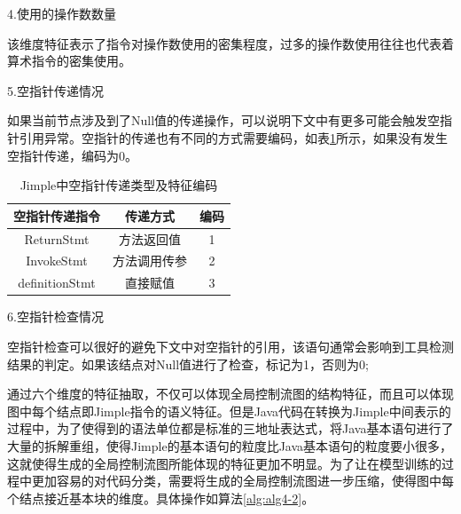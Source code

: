 4.使用的操作数数量

该维度特征表示了指令对操作数使用的密集程度，过多的操作数使用往往也代表着算术指令的密集使用。

5.空指针传递情况

如果当前节点涉及到了Null值的传递操作，可以说明下文中有更多可能会触发空指针引用异常。空指针的传递也有不同的方式需要编码，如表\ref{tab:table4-5}所示，如果没有发生空指针传递，编码为0。

\begin{table}[hb]
	\centering
	\caption{Jimple中空指针传递类型及特征编码} \label{tab:table4-5}
	\begin{tabular*}{0.9\textwidth}{@{\extracolsep{\fill}}ccc}
		\toprule
		空指针传递指令	&传递方式	&编码	 \\
		\midrule
		ReturnStmt & 方法返回值	& 1	\\
		InvokeStmt & 方法调用传参	& 2 \\
		definitionStmt & 直接赋值	&3 \\
		\bottomrule
	\end{tabular*}
\end{table}

6.空指针检查情况

空指针检查可以很好的避免下文中对空指针的引用，该语句通常会影响到工具检测结果的判定。如果该结点对Null值进行了检查，标记为1，否则为0;

通过六个维度的特征抽取，不仅可以体现全局控制流图的结构特征，而且可以体现图中每个结点即Jimple指令的语义特征。但是Java代码在转换为Jimple中间表示的过程中，为了使得到的语法单位都是标准的三地址表达式，将Java基本语句进行了大量的拆解重组，使得Jimple的基本语句的粒度比Java基本语句的粒度要小很多，这就使得生成的全局控制流图所能体现的特征更加不明显。为了让在模型训练的过程中更加容易的对代码分类，需要将生成的全局控制流图进一步压缩，使得图中每个结点接近基本块的维度。具体操作如算法\ref{alg:alg4-2}。

